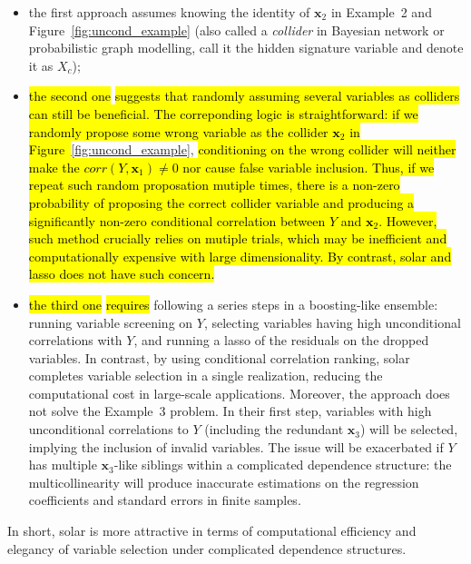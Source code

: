 \documentclass[12pt]{article}
\begin{document}
\begin{itemize}
  \item the first approach \citep[Section~2.2 and~3]{barut2016conditional} assumes knowing the identity of $\mathbf{x}_2$ in Example~2 and Figure~\ref{fig:uncond_example} (also called a \emph{collider} in Bayesian network or probabilistic graph modelling, \citet{barut2016conditional} call it the hidden signature variable and denote it as $X_c$);
  \item \hl{the second one} \citep[Section~1 and~2.2]{barut2016conditional} \hl{suggests that randomly assuming several variables as colliders can still be beneficial. The correponding logic is straightforward: if we randomly propose some wrong variable as the collider $\mathbf{x}_2$ in Figure~}\ref{fig:uncond_example}, \hl{conditioning on the wrong collider will neither make the $corr(Y,\mathbf{x}_1) \neq 0$ nor cause false variable inclusion. Thus, if we repeat such random proposation mutiple times, there is a non-zero probability of proposing the correct collider variable and producing a significantly non-zero conditional correlation between $Y$ and $\mathbf{x}_2$. However, such method crucially relies on mutiple trials, which may be inefficient and computationally expensive with large dimensionality. By contrast, solar and lasso does not have such concern.}  
  \item \hl{the third one} \citep{fan2008sure} \hl{requires} following a series steps in a boosting-like ensemble: running variable screening on $Y$, selecting variables having high unconditional correlations with $Y$, and running a lasso of the residuals on the dropped variables. In contrast, by using conditional correlation ranking, solar completes variable selection in a single realization, reducing the computational cost in large-scale applications. Moreover, the \citet{fan2008sure} approach does not solve the Example~3 problem. In their first step, variables with high unconditional correlations to $Y$ (including the redundant $\mathbf{x}_3$) will be selected, implying the inclusion of invalid variables. The issue will be exacerbated if $Y$ has multiple $\mathbf{x}_3$-like siblings within a complicated dependence structure: the multicollinearity will produce inaccurate estimations on the regression coefficients and standard errors in finite samples. 
\end{itemize}

\noindent
In short, solar is more attractive in terms of computational efficiency and elegancy of variable selection under complicated dependence structures.
\end{document}
